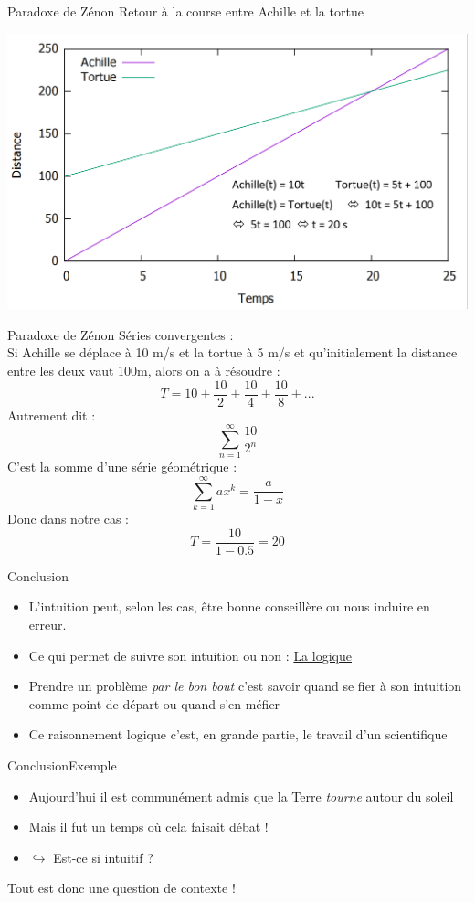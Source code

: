 \documentclass[11pt]{beamer}
\begin{document}
\begin{frame}{Paradoxe de Zénon}
Retour à la course entre Achille et la tortue 
\pause
\begin{center}
	\includegraphics[scale=0.35]{ZAPT3.png}
\end{center}
\end{frame}
\begin{frame}{Paradoxe de Zénon}
	Séries convergentes :
	\\ Si Achille se déplace à 10 m/s et la tortue à 5 m/s et qu'initialement la distance entre les deux vaut 100m, alors on a à résoudre : 
	\[ T = 10 + \frac{10}{2} +  \frac{10}{4} + \frac{10}{8} + ...\] \pause
	Autrement dit :
	\[ \sum_{n=1}^{\infty} \frac{10}{2^n}\]
	C'est la somme d'une série géométrique : \[\sum_{k=1}^{\infty} ax^k = \frac{a}{1-x} \] \pause 
	Donc dans notre cas : \[ T = \frac{10}{1- 0.5} = 20 \]
\end{frame}
\begin{frame}{Conclusion}
\begin{itemize}
	\item 	L'intuition peut, selon les cas, être bonne conseillère ou nous induire en erreur. \pause
	\item Ce qui permet de suivre son intuition ou non : \underline{La logique} \pause 
	\item Prendre un problème \textit{par le bon bout} c'est savoir quand se fier à son intuition comme point de départ ou quand s'en méfier \pause 
	\item Ce raisonnement logique c'est, en grande partie, le travail d'un scientifique
\end{itemize}
\end{frame}
\begin{frame}{Conclusion}{Exemple}

	\begin{itemize}
		\item Aujourd'hui il est communément admis que la Terre \textit{tourne} autour du soleil \pause
		\item Mais il fut un temps où cela faisait débat ! \pause
		\item[] $\hookrightarrow$ Est-ce si intuitif ? \pause 
		
	\end{itemize}
\vspace{2cm} Tout est donc une question de contexte ! 
\end{frame}
\end{document}
